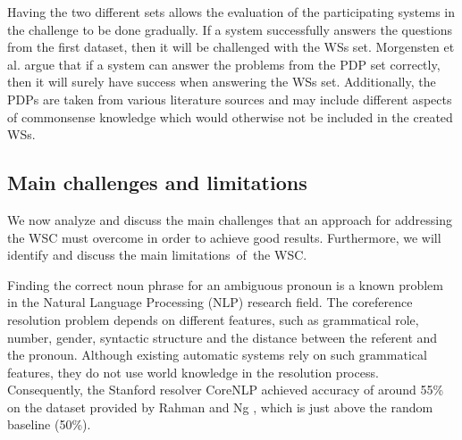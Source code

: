 Having the two different sets allows the evaluation of the participating systems in the challenge to be done gradually. 
If a system successfully answers the questions from the first dataset, then it will be challenged with the WSs set. Morgensten et al. \cite{DBLP:journals/aim/MorgensternDO16} argue that if a system can answer the problems from the PDP set correctly, then it will surely have success when answering the WSs set.  
Additionally, the PDPs are taken from various literature sources and may include different aspects of commonsense knowledge which would otherwise not be included in the created WSs. 

\begin{comment}
Since the idea of the authors of the WSC was to construct this challenge as an alternative to the Turing test, it can be observed that indeed it captures the main characteristics of a Turing test: 

\begin{itemize}
	\item it requires the subject to respond on a non-domain specific set of English sentences
	\item it is easy to solve by native English speakers
	\item to pass successfully the test, the subject has to think
\end{itemize}
\end{comment}


\subsection{Main challenges and limitations}
We now analyze and discuss the main challenges that an approach for addressing the WSC must overcome in order to achieve good results. Furthermore, we will identify and discuss the main limitations~of~the WSC. 

Finding the correct noun phrase for an ambiguous pronoun is a known problem in the Natural Language Processing (NLP) research field. The coreference resolution problem depends on different features, such as grammatical role, number, gender, syntactic structure and the distance between the referent and the pronoun. Although existing automatic systems rely on such grammatical features, they do not use world knowledge in the resolution process. Consequently, the Stanford resolver CoreNLP \cite{lee11conllst}  achieved accuracy of around 55\% on the dataset provided by Rahman and Ng \cite{DBLP:conf/emnlp/RahmanN12}, which is just above the random baseline (50\%).
	
